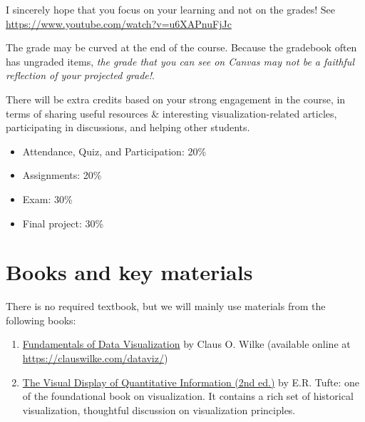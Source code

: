 \documentclass[11pt,article,oneside]{memoir} %
\begin{document}
I sincerely hope that you focus on your learning and not on the grades! See \url{https://www.youtube.com/watch?v=u6XAPnuFjJc} 

The grade may be curved at the end of the course. Because the gradebook often has ungraded items, \emph{the grade that you can see on Canvas may not be a faithful reflection of your projected grade!}. 

There will be extra credits based on your strong engagement in the course, in terms of sharing useful resources \& interesting visualization-related articles, participating in discussions, and helping other students.

\begin{itemize}%

\item Attendance, Quiz, and Participation: 20\%

\item Assignments: 20\% 

\item Exam: 30\%

\item Final project: 30\%

\end{itemize}%
\section{Books and key materials}%

There is no required textbook, but we will mainly use materials from the following books:

\begin{enumerate}
    
    \item \href{https://clauswilke.com/dataviz/}{Fundamentals of Data Visualization} by Claus O. Wilke (available online at \url{https://clauswilke.com/dataviz/})

\item \href{http://www.amazon.com/gp/product/0961392142}{The Visual Display of Quantitative Information (2nd ed.)} by E.R. Tufte: one of the foundational book on visualization. It contains a rich set of historical visualization, thoughtful discussion on visualization principles. 

\end{enumerate}
\end{document}
